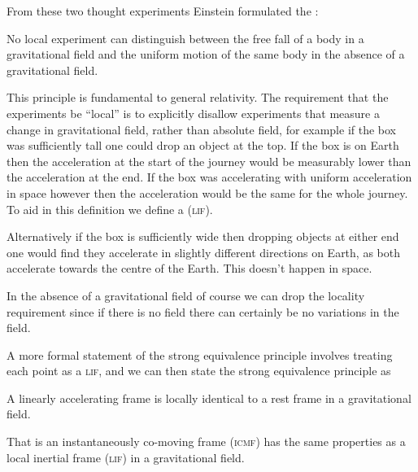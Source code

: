 \documentclass[fleqn]{NotesClass}
\newcommand{\ICMF}{\textsc{icmf}}
\newcommand{\LIF}{\textsc{lif}}
\begin{document}
    From these two thought experiments Einstein formulated the :
    \begin{important}
        No local experiment can distinguish between the free fall of a body in a gravitational field and the uniform motion of the same body in the absence of a gravitational field.
    \end{important}
    
    This principle is fundamental to general relativity.
    The requirement that the experiments be \enquote{local} is to explicitly disallow experiments that measure a change in gravitational field, rather than absolute field, for example if the box was sufficiently tall one could drop an object at the top.
    If the box is on Earth then the acceleration at the start of the journey would be measurably lower than the acceleration at the end.
    If the box was accelerating with uniform acceleration in space however then the acceleration would be the same for the whole journey.
    To aid in this definition we define a  (\LIF).
    
    Alternatively if the box is sufficiently wide then dropping objects at either end one would find they accelerate in slightly different directions on Earth, as both accelerate towards the centre of the Earth.
    This doesn't happen in space.
    
    In the absence of a gravitational field of course we can drop the locality requirement since if there is no field there can certainly be no variations in the field.
    
    A more formal statement of the strong equivalence principle involves treating each point as a \LIF{}, and we can then state the strong equivalence principle as
    \begin{important}
        A linearly accelerating frame is locally identical to a rest frame in a gravitational field.
    \end{important}
    That is an instantaneously co-moving frame (\ICMF) has the same properties as a local inertial frame (\LIF) in a gravitational field.
    
\end{document}
